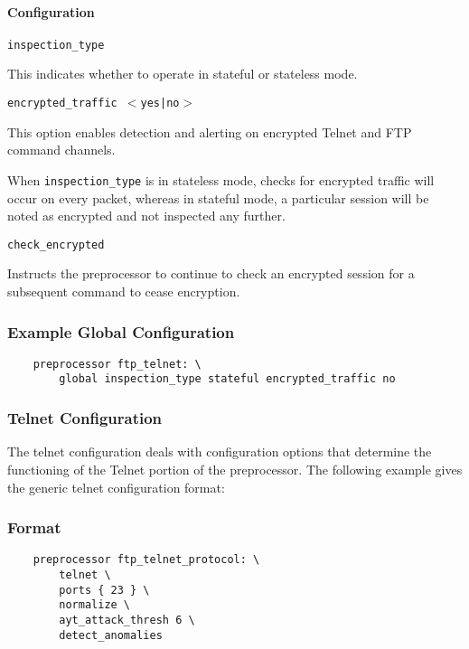 \documentclass[english]{report}
\newcounter{slistnum}
\newenvironment{slist}
{ \begin{list}{ {\bf \arabic{slistnum}.} }{\usecounter{slistnum} } }
{ \end{list} }
\newenvironment{note}{
\samepage
    \vspace{10pt}{\textsf{
        {\hspace{7pt}\Huge{$\triangle$\hspace{-12.5pt}{\Large{$^!$}}}}\hspace{5pt}
        {\Large{NOTE}}
    }
    }
   \begin{center}
    \par\vspace{-17pt}

    \begin{lrbox}{\savepar}
    \begin{minipage}[r]{6in}
}
{
    \end{minipage}
    \end{lrbox}
    \fbox{
        \usebox{
            \savepar
	}
    }
    \par\vskip10pt
    \end{center}
}
\newenvironment{note}{
        \begin{rawhtml}
        <p><table border="1"><tr><td><b>
        Note:&nbsp;&nbsp;</b>
        \end{rawhtml}
}{
        \begin{rawhtml}
        </b></td></tr></table></p>
        \end{rawhtml}
}
\begin{document}
\paragraph{Configuration}
\begin{slist}
\item \texttt{inspection\_type}

This indicates whether to operate in stateful or stateless mode.

\item \texttt{encrypted\_traffic $<$yes|no$>$}

This option enables detection and alerting on encrypted Telnet and FTP command
channels.

\begin{note}

When \texttt{inspection\_type} is in stateless mode, checks for encrypted
traffic will occur on every packet, whereas in stateful mode, a particular
session will be noted as encrypted and not inspected any further.

\end{note}

\item \texttt{check\_encrypted}

Instructs the preprocessor to continue to check an encrypted session for a
subsequent command to cease encryption.

\end{slist}

\subsubsection{Example Global Configuration}

\begin{verbatim}
    preprocessor ftp_telnet: \
        global inspection_type stateful encrypted_traffic no
\end{verbatim}

\subsubsection{Telnet Configuration}

The telnet configuration deals with configuration options that determine the
functioning of the Telnet portion of the preprocessor.  The following example
gives the generic telnet configuration format:

\subsubsection{Format}
\begin{verbatim}
    preprocessor ftp_telnet_protocol: \
        telnet \
        ports { 23 } \
        normalize \
        ayt_attack_thresh 6 \
        detect_anomalies

\end{verbatim}
\end{document}
